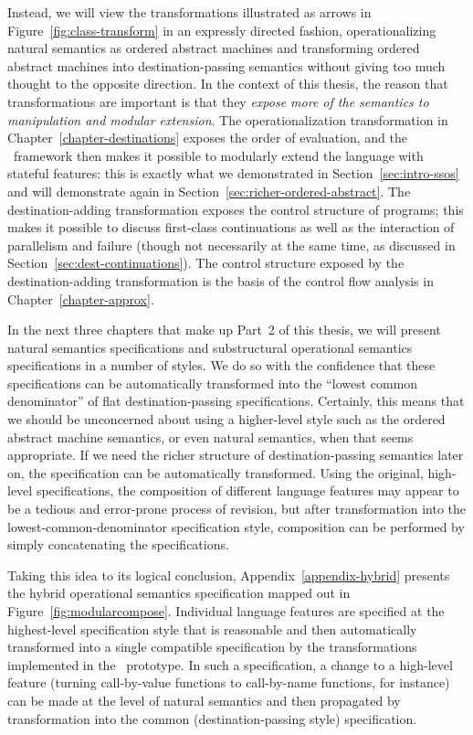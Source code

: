 Instead, we will view the transformations illustrated as arrows in
Figure~\ref{fig:class-transform} in an expressly directed fashion,
operationalizing natural semantics as ordered abstract machines and
transforming ordered abstract machines into destination-passing
semantics without giving too much thought to the opposite
direction. In the context of this thesis, the reason that
transformations are important is that they {\it expose more of the
  semantics to manipulation and modular extension}.  The
operationalization transformation in Chapter~\ref{chapter-destinations} 
exposes the order of
evaluation, and the \sls~framework then makes it possible to modularly
extend the language with stateful features: this is exactly what we
demonstrated in Section~\ref{sec:intro-ssos} and will
demonstrate again in Section~\ref{sec:richer-ordered-abstract}.  The
destination-adding transformation exposes the control structure of
programs; this makes it possible to discuss first-class continuations
as well as the interaction of parallelism and failure (though not
necessarily at the same time, as discussed in
Section~\ref{sec:dest-continuations}).  The control structure exposed
by the destination-adding transformation is the basis of the control
flow analysis in Chapter~\ref{chapter-approx}.

In the next three chapters that make up Part~2 of this thesis, we will
present natural semantics specifications and substructural operational
semantics specifications in a number of styles. We do so with the
confidence that these specifications can be automatically transformed
into the ``lowest common denominator'' of flat destination-passing
specifications.  Certainly, this means that we should be unconcerned
about using a higher-level style such as the ordered abstract machine
semantics, or even natural semantics, when that seems appropriate. If
we need the richer structure of destination-passing semantics later
on, the specification can be automatically transformed.  Using the
original, high-level specifications, the composition of different
language features may appear to be a tedious and error-prone process of
revision, but after transformation into the lowest-common-denominator
specification style, composition can be performed by simply
concatenating the specifications.

Taking this idea to its logical conclusion,
Appendix~\ref{appendix-hybrid} presents the hybrid operational
semantics specification mapped out in
Figure~\ref{fig:modularcompose}. Individual language features are
specified at the highest-level specification style that is reasonable
and then automatically transformed into a single compatible
specification by the transformations implemented in the
\sls~prototype. In such a specification, a change to a high-level
feature (turning call-by-value functions to call-by-name functions,
for instance) can be made at the level of natural semantics and
then propagated by transformation into the common (destination-passing
style) specification.



